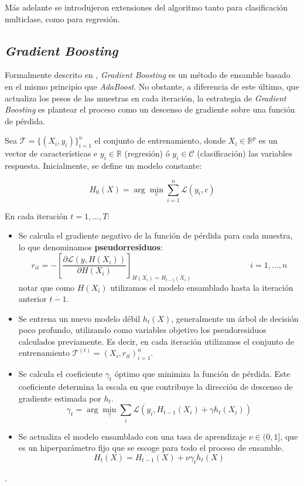 \documentclass[titlepage, 11pt]{book}
\begin{document}
Más adelante se introdujeron extensiones del algoritmo tanto para clasificación multiclase, como para regresión.

\subsection{\textit{Gradient Boosting}}
Formalmente descrito en \cite{friedman2001greedy}, \textit{Gradient Boosting} es un método de ensamble basado en el mismo principio que \textit{AdaBoost}. No obstante, a diferencia de este último, que actualiza los pesos de las muestras en cada iteración, la estrategia de \textit{Gradient Boosting} es plantear el proceso como un descenso de gradiente sobre una función de pérdida.

Sea $\mathcal{T}=\{(X_i,y_i)\}^n_{i=1}$ el conjunto de entrenamiento, donde $X_i \in \mathbb{R}^p$ es un vector de características e $y_i \in \mathbb{R}$ (regresión) ó $y_i \in \mathcal{C}$ (clasificación) las variables respuesta. Inicialmente, se define un modelo constante:

\begin{equation*}
    H_0(X)=\arg\min_{c}\sum^n_{i=1}\mathcal{L}(y_i,c)
\end{equation*}


En cada iteración $t=1, \ldots, T$:
\begin{itemize}
    \item Se calcula el gradiente negativo de la función de pérdida para cada muestra, lo que denominamos \textbf{pseudorresiduos}:
        \begin{equation*}
            r_{it}=-\left[ \frac{\partial \mathcal{L}(y,H(X_i))}{\partial H(X_i)} \right]_{H(X_i)=H_{t-1}(X_i)} \hspace{3cm}    i=1,\ldots,n
        \end{equation*}
        notar que como $H(X_i)$ utilizamos el modelo ensamblado hasta la iteración anterior $t-1$.

    \item Se entrena un nuevo modelo débil $h_t(X)$, generalmente un árbol de decisión poco profundo, utilizando como variables objetivo los pseudoresiduos calculados previamente. Es decir, en cada iteración utilizamos el conjunto de entrenamiento $\mathcal{T}^{(t)}={(X_i, r_{it})}_{i=1}^n$.

    \item Se calcula el coeficiente $\gamma_t$ óptimo que minimiza la función de pérdida. Este coeficiente determina la escala en que contribuye la dirección de descenso de gradiente estimada por $h_t$.
        \begin{equation*}
            \gamma_t=\arg\min_\gamma\sum_i\mathcal{L}(y_i,H_{t-1}(X_i)+\gamma h_t(X_i))
        \end{equation*}

    \item Se actualiza el modelo ensamblado con una tasa de aprendizaje $\nu \in (0,1]$, que es un hiperparámetro fijo que se escoge para todo el proceso de ensamble.
        \begin{equation*}
            H_t(X)=H_{t-1}(X)+\nu \gamma_t h_t(X)
        \end{equation*}
\end{itemize}.
\end{document}
